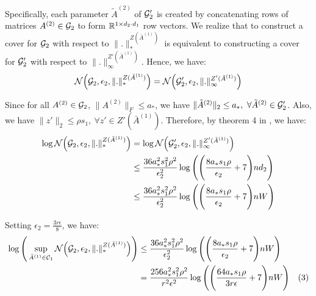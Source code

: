 \noindent Specifically, each parameter $\tilde A^{(2)}$ of $\mathcal{G}_2'$ is created by concatenating rows of matrices $A^{(2)}\in \mathcal{G}_2$ to form $\mathbb{R}^{1\times d_2\cdot d_1}$ row vectors. We realize that to construct a cover for $\mathcal{G}_2$ with respect to $\|.\|_*^{Z(\bar A^{(1)})}$ is equivalent to constructing a cover for $\mathcal{G}_2'$ with respect to $\|.\|_\infty^{Z'(\bar A^{(1)})}$. Hence, we have:
\begin{align*}
    \mathcal{N}\Big( \mathcal{G}_2, \epsilon_2, \|.\|_*^{Z(\bar A^{(1)})} \Big) = \mathcal{N}\Big( \mathcal{G}_2', \epsilon_2, \|.\|_\infty^{Z'(\bar A^{(1)})} \Big)
\end{align*}

\noindent Since for all $A^{(2)}\in \mathcal{G}_2$, $\|A^{(2)}\|_F\le a_*$, we have $\|\tilde A^{(2)}\|_2\le a_*, \ \forall \tilde A^{(2)} \in \G_2'$. Also, we have $\|z'\|_2\le \rho s_1, \ \forall z'\in Z'(\bar A^{(1)})$. Therefore, by theorem 4 in \cite{article:tong_zhang}, we have:
\begin{align*}
    \log\mathcal{N}\Big( \mathcal{G}_2, \epsilon_2, \|.\|_*^{Z(\bar A^{(1)})} \Big) &= \log\mathcal{N}\Big( \mathcal{G}_2', \epsilon_2, \|.\|_\infty^{Z'(\bar A^{(1)})} \Big) \\
        &\le \frac{36a_*^2s_1^2\rho^2}{\epsilon_2^2} \log\Bigg( 
            \Bigg( 
                \frac{8a_*s_1\rho}{\epsilon_2} + 7
             \Bigg)nd_2
         \Bigg) \\
        &\le \frac{36a_*^2s_1^2\rho^2}{\epsilon_2^2} \log\Bigg( 
            \Bigg( 
                \frac{8a_*s_1\rho}{\epsilon_2} + 7
             \Bigg)nW
         \Bigg)
\end{align*}
        
\noindent Setting $\epsilon_2 = \frac{3r\epsilon}{8}$, we have:
\begin{align*}
    \log\Bigg( 
        \sup_{\bar A^{(1)} \in \mathcal{C}_1} \mathcal{N}\Big( \mathcal{G}_2, \epsilon_2, \|.\|_*^{Z(\bar A^{(1)})} \Big)
     \Bigg) &\le \frac{36a_*^2s_1^2\rho^2}{\epsilon_2^2} \log\Bigg( 
        \Bigg( 
            \frac{8a_*s_1\rho}{\epsilon_2} + 7
         \Bigg)nW
     \Bigg) \\
    &= \frac{256a_*^2s_1^2\rho^2}{r^2\epsilon^2} \log\Bigg( 
        \Bigg( 
            \frac{64a_*s_1\rho}{3r\epsilon} + 7
         \Bigg)nW
     \Bigg) \ \ \ (3)
\end{align*}

